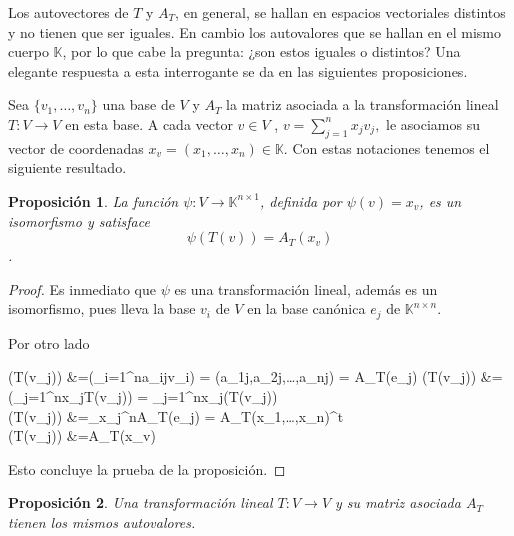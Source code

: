 \documentclass[b5paper, 11pt]{book}
\newcommand{\0}{\mathbf{0}}
\theoremstyle{estiloB}
\theoremstyle{estiloC}
\theoremstyle{estiloD}
\newtheorem{proposition}{Proposición}[section]
\begin{document}
Los autovectores de $T$ y $A_{T}$, en general, se hallan en espacios vectoriales distintos y no tienen que ser iguales. En cambio los autovalores que se hallan en el mismo cuerpo $\mathbb{K}$, por lo que cabe la pregunta: ¿son estos iguales o distintos? Una elegante respuesta a esta interrogante se da en las siguientes proposiciones.

Sea $\{v_1,\ldots,v_n\}$ una base de $V$ y $A_{T}$ la matriz asociada a la transformación lineal $T\colon V \rightarrow{V}$ en esta base. A cada vector $v\in V$ , $v = \sum\limits_{j=1}^{n}x_{j}v_{j},$ le asociamos su vector de coordenadas $x_v=(x_1,\ldots,x_n)\in\mathbb{K}$. Con estas notaciones tenemos el siguiente resultado.

\begin{proposition}
	La función $\psi\colon V\rightarrow\mathbb{K}^{n\times 1}$, definida por $\psi(v)= x_v$, es un isomorfismo y satisface \[ \psi(T(v))=A_{T}(x_v) \].    
\end{proposition}

\begin{proof}
	Es inmediato que $\psi$ es una transformación lineal, además es un isomorfismo, pues lleva la base $v_{i}$ de $V$ en la base canónica $e_{j}$ de $\mathbb{K}^{n \times n}$.
	
	Por otro lado
	
	\begin{flalign*}
	\psi(T(v_{j}))  &=\psi(\sum\limits_{i=1}^{n}a_{ij}v_{i}) = (a_{1j},a_{2j},\ldots,a_{nj}) = A_{T}(e_{j})
	\psi(T(v_{j}))  &=\psi(\sum\limits_{j=1}^{n}x_{j}T(v_{j})) = \sum\limits_{j=1}^{n}x_{j}\psi(T(v_{j}))\\
	\psi(T(v_{j}))  &=\sum\limits_{x_{j}}^{n}{A_{T}}(e_{j}) = A_{T}(x_{1},\ldots,x_{n})^{t}\\
	\psi(T(v_{j}))  &=A_{T}(x_{v})
	\end{flalign*}
	Esto concluye la prueba de la proposición.
\end{proof}

\begin{proposition}
	Una transformación lineal $T\colon V\rightarrow V$ y su matriz asociada $A_{T}$ tienen los mismos autovalores.
\end{proposition}
\end{document}
